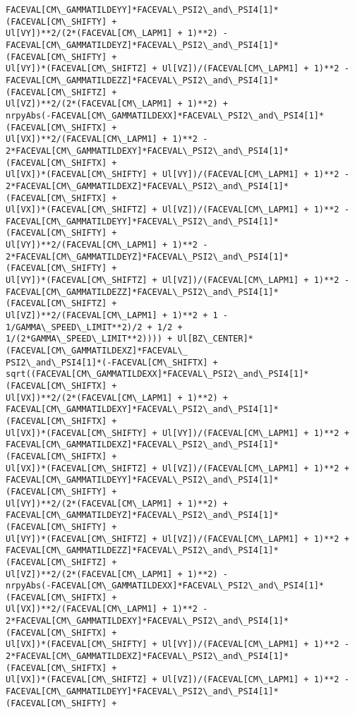 \documentclass[landscape,letterpaper,10pt,english]{article}
\begin{document}
\begin{Verbatim}[commandchars=\\\{\}]
FACEVAL[CM\_GAMMATILDEYY]*FACEVAL\_PSI2\_and\_PSI4[1]*(FACEVAL[CM\_SHIFTY] +
Ul[VY])**2/(2*(FACEVAL[CM\_LAPM1] + 1)**2) -
FACEVAL[CM\_GAMMATILDEYZ]*FACEVAL\_PSI2\_and\_PSI4[1]*(FACEVAL[CM\_SHIFTY] +
Ul[VY])*(FACEVAL[CM\_SHIFTZ] + Ul[VZ])/(FACEVAL[CM\_LAPM1] + 1)**2 -
FACEVAL[CM\_GAMMATILDEZZ]*FACEVAL\_PSI2\_and\_PSI4[1]*(FACEVAL[CM\_SHIFTZ] +
Ul[VZ])**2/(2*(FACEVAL[CM\_LAPM1] + 1)**2) +
nrpyAbs(-FACEVAL[CM\_GAMMATILDEXX]*FACEVAL\_PSI2\_and\_PSI4[1]*(FACEVAL[CM\_SHIFTX] +
Ul[VX])**2/(FACEVAL[CM\_LAPM1] + 1)**2 -
2*FACEVAL[CM\_GAMMATILDEXY]*FACEVAL\_PSI2\_and\_PSI4[1]*(FACEVAL[CM\_SHIFTX] +
Ul[VX])*(FACEVAL[CM\_SHIFTY] + Ul[VY])/(FACEVAL[CM\_LAPM1] + 1)**2 -
2*FACEVAL[CM\_GAMMATILDEXZ]*FACEVAL\_PSI2\_and\_PSI4[1]*(FACEVAL[CM\_SHIFTX] +
Ul[VX])*(FACEVAL[CM\_SHIFTZ] + Ul[VZ])/(FACEVAL[CM\_LAPM1] + 1)**2 -
FACEVAL[CM\_GAMMATILDEYY]*FACEVAL\_PSI2\_and\_PSI4[1]*(FACEVAL[CM\_SHIFTY] +
Ul[VY])**2/(FACEVAL[CM\_LAPM1] + 1)**2 -
2*FACEVAL[CM\_GAMMATILDEYZ]*FACEVAL\_PSI2\_and\_PSI4[1]*(FACEVAL[CM\_SHIFTY] +
Ul[VY])*(FACEVAL[CM\_SHIFTZ] + Ul[VZ])/(FACEVAL[CM\_LAPM1] + 1)**2 -
FACEVAL[CM\_GAMMATILDEZZ]*FACEVAL\_PSI2\_and\_PSI4[1]*(FACEVAL[CM\_SHIFTZ] +
Ul[VZ])**2/(FACEVAL[CM\_LAPM1] + 1)**2 + 1 - 1/GAMMA\_SPEED\_LIMIT**2)/2 + 1/2 +
1/(2*GAMMA\_SPEED\_LIMIT**2)))) + Ul[BZ\_CENTER]*(FACEVAL[CM\_GAMMATILDEXZ]*FACEVAL\_
PSI2\_and\_PSI4[1]*(-FACEVAL[CM\_SHIFTX] +
sqrt((FACEVAL[CM\_GAMMATILDEXX]*FACEVAL\_PSI2\_and\_PSI4[1]*(FACEVAL[CM\_SHIFTX] +
Ul[VX])**2/(2*(FACEVAL[CM\_LAPM1] + 1)**2) +
FACEVAL[CM\_GAMMATILDEXY]*FACEVAL\_PSI2\_and\_PSI4[1]*(FACEVAL[CM\_SHIFTX] +
Ul[VX])*(FACEVAL[CM\_SHIFTY] + Ul[VY])/(FACEVAL[CM\_LAPM1] + 1)**2 +
FACEVAL[CM\_GAMMATILDEXZ]*FACEVAL\_PSI2\_and\_PSI4[1]*(FACEVAL[CM\_SHIFTX] +
Ul[VX])*(FACEVAL[CM\_SHIFTZ] + Ul[VZ])/(FACEVAL[CM\_LAPM1] + 1)**2 +
FACEVAL[CM\_GAMMATILDEYY]*FACEVAL\_PSI2\_and\_PSI4[1]*(FACEVAL[CM\_SHIFTY] +
Ul[VY])**2/(2*(FACEVAL[CM\_LAPM1] + 1)**2) +
FACEVAL[CM\_GAMMATILDEYZ]*FACEVAL\_PSI2\_and\_PSI4[1]*(FACEVAL[CM\_SHIFTY] +
Ul[VY])*(FACEVAL[CM\_SHIFTZ] + Ul[VZ])/(FACEVAL[CM\_LAPM1] + 1)**2 +
FACEVAL[CM\_GAMMATILDEZZ]*FACEVAL\_PSI2\_and\_PSI4[1]*(FACEVAL[CM\_SHIFTZ] +
Ul[VZ])**2/(2*(FACEVAL[CM\_LAPM1] + 1)**2) -
nrpyAbs(-FACEVAL[CM\_GAMMATILDEXX]*FACEVAL\_PSI2\_and\_PSI4[1]*(FACEVAL[CM\_SHIFTX] +
Ul[VX])**2/(FACEVAL[CM\_LAPM1] + 1)**2 -
2*FACEVAL[CM\_GAMMATILDEXY]*FACEVAL\_PSI2\_and\_PSI4[1]*(FACEVAL[CM\_SHIFTX] +
Ul[VX])*(FACEVAL[CM\_SHIFTY] + Ul[VY])/(FACEVAL[CM\_LAPM1] + 1)**2 -
2*FACEVAL[CM\_GAMMATILDEXZ]*FACEVAL\_PSI2\_and\_PSI4[1]*(FACEVAL[CM\_SHIFTX] +
Ul[VX])*(FACEVAL[CM\_SHIFTZ] + Ul[VZ])/(FACEVAL[CM\_LAPM1] + 1)**2 -
FACEVAL[CM\_GAMMATILDEYY]*FACEVAL\_PSI2\_and\_PSI4[1]*(FACEVAL[CM\_SHIFTY] +

\end{Verbatim}
\end{document}
